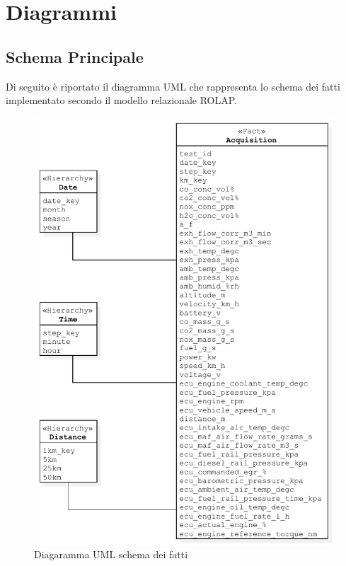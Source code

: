 \section{Diagrammi} \label{sec:diagrams}
\subsection{Schema Principale}
Di seguito è riportato il diagramma UML che rappresenta lo schema dei fatti implementato secondo il modello relazionale ROLAP.
\begin{figure}[H]
	\centering
	\includegraphics[scale=0.80]{figures/class_fact_scheme}
	\caption{Diagaramma UML schema dei fatti}
	\label{fig:ofm}
\end{figure}
